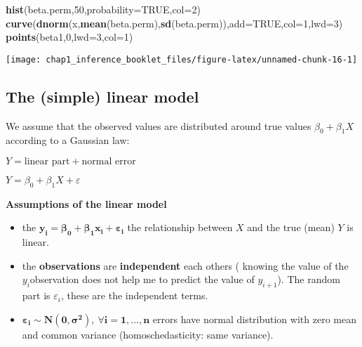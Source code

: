 \documentclass[]{article}
\newenvironment{Shaded}{\begin{snugshade}}{\end{snugshade}}
\newcommand{\KeywordTok}[1]{\textcolor[rgb]{0.13,0.29,0.53}{\textbf{#1}}}
\newcommand{\DataTypeTok}[1]{\textcolor[rgb]{0.13,0.29,0.53}{#1}}
\newcommand{\DecValTok}[1]{\textcolor[rgb]{0.00,0.00,0.81}{#1}}
\newcommand{\OtherTok}[1]{\textcolor[rgb]{0.56,0.35,0.01}{#1}}
\newcommand{\NormalTok}[1]{#1}
\providecommand{\tightlist}{%
  \setlength{\itemsep}{0pt}\setlength{\parskip}{0pt}}
\begin{document}
\begin{Shaded}
\begin{Highlighting}[]
\KeywordTok{hist}\NormalTok{(beta.perm,}\DecValTok{50}\NormalTok{,}\DataTypeTok{probability=}\OtherTok{TRUE}\NormalTok{,}\DataTypeTok{col=}\DecValTok{2}\NormalTok{)}
\KeywordTok{curve}\NormalTok{(}\KeywordTok{dnorm}\NormalTok{(x,}\KeywordTok{mean}\NormalTok{(beta.perm),}\KeywordTok{sd}\NormalTok{(beta.perm)),}\DataTypeTok{add=}\OtherTok{TRUE}\NormalTok{,}\DataTypeTok{col=}\DecValTok{1}\NormalTok{,}\DataTypeTok{lwd=}\DecValTok{3}\NormalTok{)}
\KeywordTok{points}\NormalTok{(beta1,}\DecValTok{0}\NormalTok{,}\DataTypeTok{lwd=}\DecValTok{3}\NormalTok{,}\DataTypeTok{col=}\DecValTok{1}\NormalTok{)}
\end{Highlighting}
\end{Shaded}

\begin{center}\texttt{[image: chap1\_inference\_booklet\_files/figure-latex/unnamed-chunk-16-1]} \end{center}

\subsection{The (simple) linear model}\label{the-simple-linear-model}

We assume that the observed values are distributed around true values
\(\beta_0 + \beta_1 X\) according to a Gaussian law:

\(Y=\textrm{linear part} + \textrm{normal error}\)

\(Y=\beta_0 + \beta_1 X + \varepsilon\)

\textbf{Assumptions of the linear model }

\begin{itemize}
\tightlist
\item
  the \(\boldsymbol{y_i=\beta_0 + \beta_1 x_i + \varepsilon_i}\) the
  relationship between \(X\) and the true (mean) \(Y\) is linear.
\item
  the \textbf{observations } are \textbf{independent} each others (
  knowing the value of the \(y_i\)observation does not help me to
  predict the value of \(y_{i + 1}\)). The random part is
  \(\varepsilon_i\), these are the independent terms.
\item
  \(\boldsymbol{\varepsilon_i \sim N (0, \sigma ^ 2), \ \forall i=1, \ldots, n}\)
  errors have normal distribution with zero mean and common variance
  (homoschedasticity: same variance).
\end{itemize}
\end{document}
